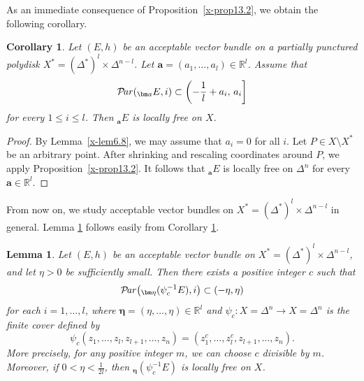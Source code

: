 \documentclass[12pt,twoside]{amsart}
\DeclareMathOperator{\Par}{\mathcal{P}\!\it{ar}}
\newtheorem{lem}[thm]{Lemma}
\newtheorem{cor}[thm]{Corollary}
\theoremstyle{definition}
\begin{document}
As an immediate consequence of Proposition~\ref{x-prop13.2}, we obtain
the following corollary.

\begin{cor}\label{x-cor13.3} 
Let $(E,h)$ be an acceptable vector bundle on a partially punctured
polydisk $X^*=(\Delta^*)^l\times \Delta^{n-l}$. 
Let $\bm a=(a_1, \ldots, a_l)\in \mathbb R^l$. 
Assume that
\[
\Par(_{\bm a}E,i)\subset
\left(-\frac{1}{l}+a_i,\,a_i\right]
\]
for every $1\le i\le l$.
Then ${}_{\bm a}E$ is locally free on $X$.
\end{cor}

\begin{proof}
By Lemma~\ref{x-lem6.8}, we may assume that $a_i=0$ for all $i$.
Let $P\in X\setminus X^*$ be an arbitrary point.
After shrinking and rescaling coordinates around $P$, we apply
Proposition~\ref{x-prop13.2}.
It follows that ${}_{\bm a}E$ is locally free on $\Delta^n$ for every
$\bm a\in\mathbb R^l$.
\end{proof}

From now on, we study acceptable vector bundles on 
$X^*=(\Delta^*)^l \times \Delta^{n-l}$ in general. 
Lemma \ref{x-lem13.4} follows easily from Corollary \ref{x-cor13.3}.

\begin{lem}\label{x-lem13.4}
Let $(E, h)$ be an acceptable vector bundle 
on $X^*=(\Delta^*)^l\times \Delta^{n-l}$, 
and let $\eta>0$ be sufficiently small. 
Then there exists a positive integer $c$ such that
\[
\Par\bigl({}_{\bm \eta} (\psi_c^{-1}E), i\bigr) \subset (-\eta, \eta)
\] 
for each $i=1, \dots, l$, 
where $\bm \eta=(\eta, \dots, \eta)\in \mathbb R^l$ and 
$\psi_c \colon X=\Delta^n\to X=\Delta^n$ is the finite cover
defined by
\[
\psi_c(z_1, \dots, z_l, z_{l+1}, \dots, z_n) =
(z_1^c, \dots, z_l^c, z_{l+1}, \dots, z_n).
\] 
More precisely, for any positive integer $m$, we can choose $c$ divisible by $m$. 
Moreover, if $0<\eta<\frac{1}{2l}$, then ${}_{\bm \eta} (\psi_c^{-1}E)$ 
is locally free on $X$.
\end{lem}
\end{document}
